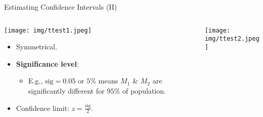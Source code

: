 \begin{frame}{Estimating Confidence Intervals (II)}
	\begin{columns}
		\begin{column}{0.5\textwidth}
			\vspace{-6cm}
			\centering
			\texttt{[image: img/ttest1.jpeg]}
			\begin{itemize}
				\item Symmetrical.
				\item \textbf{\color{airforceblue}Significance level}:
				      \begin{itemize}
					      \item E.g., $\text{sig} = 0.05$ or $5\%$ means $M_1$ \& $M_2$ are significantly different for $95\%$ of population.
				      \end{itemize}
				\item Confidence limit: $z = \frac{\text{sig}}{2}$.
			\end{itemize}
		\end{column}
		\begin{column}{0.5\textwidth}
			\centering
			\texttt{[image: img/ttest2.jpeg]}
		\end{column}
	\end{columns}
\end{frame}

